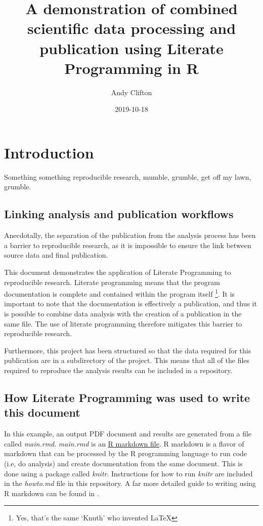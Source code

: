 \documentclass[11pt,]{article}
\title{A demonstration of combined scientific data processing and publication using Literate Programming in R}
\author{Andy Clifton}
\date{2019-10-18}
\let\rmarkdownfootnote\footnote%
\def\footnote{\protect\rmarkdownfootnote}
\begin{document}
\maketitle

{
\hypersetup{linkcolor=black}
\setcounter{tocdepth}{2}
\tableofcontents
}
\hypertarget{introduction}{%
\section{Introduction}\label{introduction}}

Something something reproducible research, mumble, grumble, get off my lawn, grumble.

\hypertarget{linking-analysis-and-publication-workflows}{%
\subsection{Linking analysis and publication workflows}\label{linking-analysis-and-publication-workflows}}

Anecdotally, the separation of the publication from the analysis process has been a barrier to reproducible research, as it is impossible to ensure the link between source data and final publication.

This document demonstrates the application of Literate Programming to reproducible research. Literate programming means that the program documentation is complete and contained within the program itself \citep{Knuth1984}\footnote{Yes, that's the same `Knuth' who invented LaTeX}. It is important to note that the documentation is effectively a publication, and thus it is possible to combine data analysis with the creation of a publication in the same file. The use of literate programming therefore mitigates this barrier to reproducible research.

Furthermore, this project has been structured so that the data required for this publication are in a subdirectory of the project. This means that all of the files required to reproduce the analysis results can be included in a repository.

\hypertarget{how-literate-programming-was-used-to-write-this-document}{%
\subsection{How Literate Programming was used to write this document}\label{how-literate-programming-was-used-to-write-this-document}}

In this example, an output PDF document and results are generated from a file called \emph{main.rmd}. \emph{main.rmd} is an \href{https://rmarkdown.rstudio.com/authoring_basics.html}{R markdown file}. R markdown is a flavor of markdown that can be processed by the R programming language \citep{R-base} to run code (i.e, do analysis) and create documentation from the same document. This is done using a package called \emph{knitr}. Instructions for how to run \emph{knitr} are included in the \emph{howto.md} file in this repository. A far more detailed guide to writing using R markdown can be found in \citet{R-Markdown-Guide}.
\end{document}

